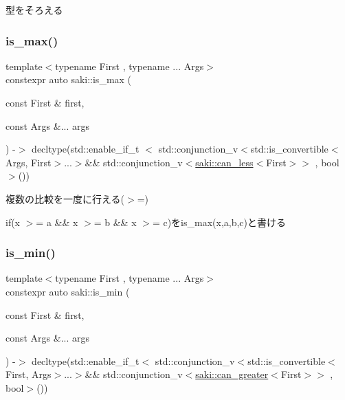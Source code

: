 型をそろえる 

\mbox{\label{namespacesaki_a0fe50c96fb27e8f05d202e4635b582a2}} 
\subsubsection{\texorpdfstring{is\+\_\+max()}{is\_max()}}
{\footnotesize\ttfamily template$<$typename First , typename ... Args$>$ \\
constexpr auto saki\+::is\+\_\+max (\begin{DoxyParamCaption}\item[{const First \&}]{first,  }\item[{const Args \&...}]{args }\end{DoxyParamCaption}) -\/$>$ decltype(std\+::enable\+\_\+if\+\_\+t $<$
			std\+::conjunction\+\_\+v$<$std\+::is\+\_\+convertible$<$Args, First$>$...$>$\&\&
			std\+::conjunction\+\_\+v$<$\mbox{\hyperlink{structsaki_1_1can__less}{saki\+::can\+\_\+less}}$<$First$>$$>$
			, bool$>$())
	}



複数の比較を一度に行える($>$=) 

if(x $>$= a \&\& x $>$= b \&\& x $>$= c)をis\+\_\+max(x,a,b,c)と書ける \mbox{\label{namespacesaki_a223be67dabf8c1215122d80d0cc811c4}} 
\subsubsection{\texorpdfstring{is\+\_\+min()}{is\_min()}}
{\footnotesize\ttfamily template$<$typename First , typename ... Args$>$ \\
constexpr auto saki\+::is\+\_\+min (\begin{DoxyParamCaption}\item[{const First \&}]{first,  }\item[{const Args \&...}]{args }\end{DoxyParamCaption}) -\/$>$ decltype(std\+::enable\+\_\+if\+\_\+t$<$
			std\+::conjunction\+\_\+v$<$std\+::is\+\_\+convertible$<$First, Args$>$...$>$\&\&
			std\+::conjunction\+\_\+v$<$\mbox{\hyperlink{structsaki_1_1can__greater}{saki\+::can\+\_\+greater}}$<$First$>$$>$
			, bool$>$())
	}



